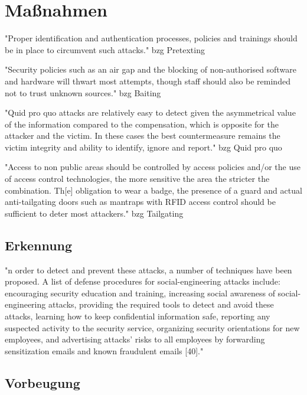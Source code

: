 \chapter{Maßnahmen}

"Proper identification and authentication processes, policies and trainings should be in place to circumvent such attacks."\cite{1_enisa}
bzg Pretexting

"Security policies such as an air gap and the blocking of non-authorised software and hardware will thwart most attempts,
though staff should also be reminded not to trust unknown sources."\cite{1_enisa}
bzg Baiting

"Quid pro quo attacks are relatively easy to detect given the asymmetrical value of the information compared to the compensation,
which is opposite for the attacker and the victim. In these cases the best countermeasure remains the victim integrity and ability to identify, ignore and report."\cite{1_enisa}
bzg Quid pro quo

"Access to non public areas should be controlled by access policies and/or the use of access control technologies, the more sensitive the area the stricter the combination.
Th[e] obligation to wear a badge, the presence of a guard and actual anti-tailgating doors such as mantraps with RFID access control should be sufficient to deter most attackers."\cite{1_enisa}
bzg Tailgating




\section{Erkennung}

"n order to detect and prevent these attacks, a number of techniques have been proposed. A list of defense procedures for social-engineering attacks include: encouraging security
education and training, increasing social awareness of social-engineering attacks, providing the required tools to detect and avoid these attacks, learning how to keep
confidential information safe, reporting any suspected activity to the security service, organizing security orientations for new employees, and advertising attacks’ risks to
all employees by forwarding sensitization emails and known fraudulent emails [40]."\cite{4_mdpi}

\section{Vorbeugung}

